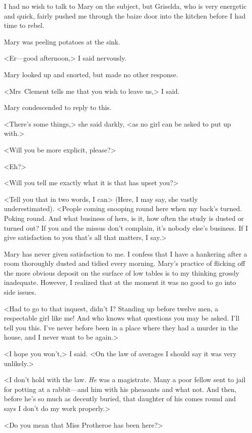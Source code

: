 I had no wish to talk to Mary on the subject, but Griselda, who is very energetic and quick, fairly pushed me through the baize door into the kitchen before I had time to rebel.

Mary was peeling potatoes at the sink.

<Er—good afternoon,> I said nervously.

Mary looked up and snorted, but made no other response.

<Mrs~Clement tells me that you wish to leave us,> I said.

Mary condescended to reply to this.

<There's some things,> she said darkly, <as no girl can be asked to put up with.>

<Will you be more explicit, please?>

<Eh?>

<Will you tell me exactly what it is that has upset you?>

<Tell you that in two words, I can> (Here, I may say, she vastly underestimated). <People coming snooping round here when my back's turned. Poking round. And what business of hers, is it, how often the study is dusted or turned out? If you and the missus don't complain, it's nobody else's business. If I give satisfaction to you that's all that matters, I say.>

Mary has never given satisfaction to me. I confess that I have a hankering after a room thoroughly dusted and tidied every morning. Mary's practice of flicking off the more obvious deposit on the surface of low tables is to my thinking grossly inadequate. However, I realized that at the moment it was no good to go into side issues.

<Had to go to that inquest, didn't I? Standing up before twelve men, a respectable girl like me! And who knows what questions you may be asked. I'll tell you this. I've never before been in a place where they had a murder in the house, and I never want to be again.>

<I hope you won't,> I said. <On the law of averages I should say it was very unlikely.>

<I don't hold with the law. \emph{He} was a magistrate. Many a poor fellow sent to jail for potting at a rabbit—and him with his pheasants and what not. And then, before he's so much as decently buried, that daughter of his comes round and says I don't do my work properly.>

<Do you mean that Miss Protheroe has been here?>

